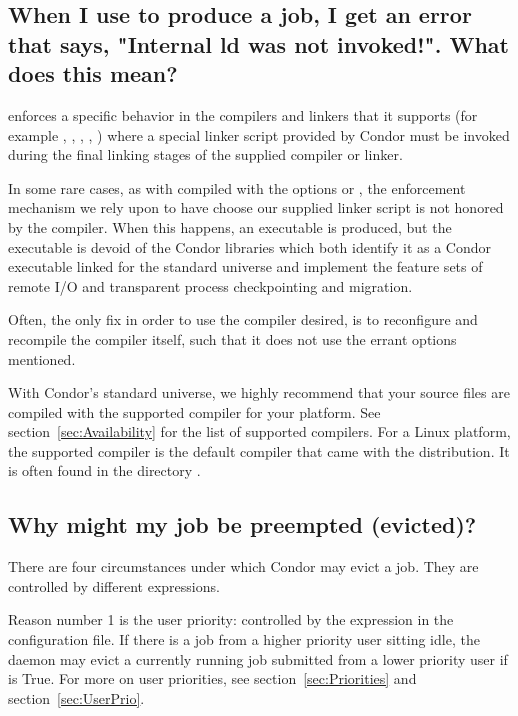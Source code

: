 \subsection*{When I use  to produce a job, I get an error that says, "Internal ld was not invoked!". What does this mean?}

 enforces a specific behavior in the compilers and
linkers that it supports
(for example , , , , )
where a special linker script
provided by Condor must be invoked during the final linking stages of
the supplied compiler or linker.

In some rare cases,
as with  compiled with
the options  or ,
the enforcement mechanism
we rely upon to have 
choose our supplied linker script is not honored
by the compiler.
When this happens, an executable is produced,
but the executable is devoid of the
Condor libraries which both identify it as a Condor executable linked
for the standard universe and implement the feature sets of remote I/O
and transparent process checkpointing and migration.

Often, the only fix in order to use the compiler desired,
is to reconfigure and recompile the compiler itself,
such that it does not use the errant options mentioned. 

With Condor's standard universe,
we highly recommend that your source files
are compiled with the supported compiler for your platform.
See
section~\ref{sec:Availability}
for the list of supported compilers.
For a Linux platform, the supported compiler
is the default compiler that came with the distribution.
It is often found in the directory .

\subsection*{Why might my job be preempted (evicted)?}

There are four circumstances under which Condor may evict a job.
They are controlled by different expressions.

Reason number 1 is the user priority:
controlled by the 
expression in the configuration file.
If there is a job from a 
higher priority user sitting idle,
the  daemon may evict 
a currently running job submitted from a lower priority user if 
 is True.
For more on user priorities,
see section~\ref{sec:Priorities} and
section~\ref{sec:UserPrio}.

